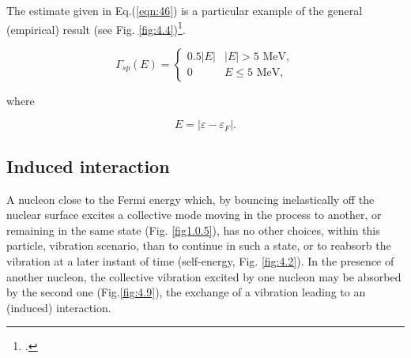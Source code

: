 The estimate given in Eq.(\ref{eqn:46}) is a particular example of the general (empirical) result (see Fig. \ref{fig:4.4})\footnote{\cite{Bertsch:83}.}.

\begin{equation}
\Gamma_{sp} (E) =
  \begin{cases}
    0.5 |E| & \text{$|E|>5$ MeV}, \\
    0     & \text{$E \leq 5$ MeV},
  \end{cases}
\label{eqn:47}
\end{equation}

\noindent where

\begin{equation}
E = |\varepsilon - \varepsilon_F| .
\label{eqn:48}
\end{equation}

\subsection{Induced interaction}\label{Sect2.3.2}

A nucleon close to the Fermi energy which, by bouncing inelastically off the nuclear surface excites a collective mode moving in the process to another, or remaining in the same state (Fig. \ref{fig1.0.5}), has no other choices, within this particle, vibration scenario, than to continue in such a state, or to reabsorb the vibration at a later instant of time (self-energy, Fig. \ref{fig:4.2}). In the presence of another nucleon, the   collective vibration excited  by one nucleon may be absorbed by the second one (Fig.\ref{fig:4.9}), the exchange of a vibration leading to an (induced) interaction.

